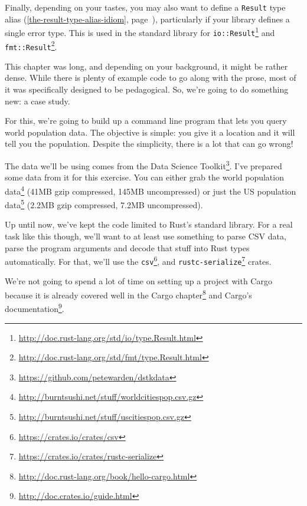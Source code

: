 \documentclass[a4paper,]{book}
\renewcommand*{\hyperref}[2][\ar]{%
  \def\ar{#2}%
  #2 (\autoref{#1}, page~\pageref{#1})}
\renewcommand{\href}[2]{#2\footnote{\url{#1}}}
\begin{document}
Finally, depending on your tastes, you may also want to define a
\hyperref[the-result-type-alias-idiom]{\texttt{Result} type alias},
particularly if your library defines a single error type. This is used
in the standard library for
\href{http://doc.rust-lang.org/std/io/type.Result.html}{\texttt{io::Result}}
and
\href{http://doc.rust-lang.org/std/fmt/type.Result.html}{\texttt{fmt::Result}}.


This chapter was long, and depending on your background, it might be
rather dense. While there is plenty of example code to go along with the
prose, most of it was specifically designed to be pedagogical. So, we're
going to do something new: a case study.

For this, we're going to build up a command line program that lets you
query world population data. The objective is simple: you give it a
location and it will tell you the population. Despite the simplicity,
there is a lot that can go wrong!

The data we'll be using comes from the
\href{https://github.com/petewarden/dstkdata}{Data Science Toolkit}.
I've prepared some data from it for this exercise. You can either grab
the \href{http://burntsushi.net/stuff/worldcitiespop.csv.gz}{world
population data} (41MB gzip compressed, 145MB uncompressed) or just the
\href{http://burntsushi.net/stuff/uscitiespop.csv.gz}{US population
data} (2.2MB gzip compressed, 7.2MB uncompressed).

Up until now, we've kept the code limited to Rust's standard library.
For a real task like this though, we'll want to at least use something
to parse CSV data, parse the program arguments and decode that stuff
into Rust types automatically. For that, we'll use the
\href{https://crates.io/crates/csv}{\texttt{csv}}, and
\href{https://crates.io/crates/rustc-serialize}{\texttt{rustc-serialize}}
crates.


We're not going to spend a lot of time on setting up a project with
Cargo because it is already covered well in
\href{http://doc.rust-lang.org/book/hello-cargo.html}{the Cargo chapter}
and \href{http://doc.crates.io/guide.html}{Cargo's documentation}.
\end{document}
